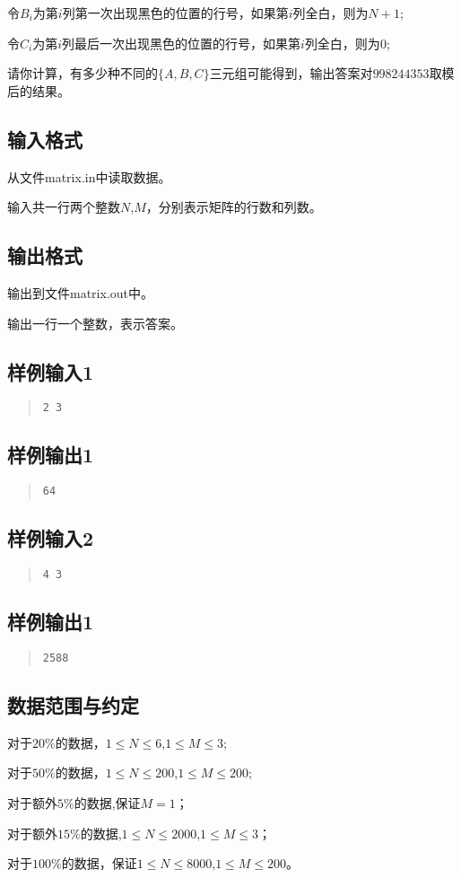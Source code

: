 ﻿\documentclass[12pt, a4paper]{article}
\begin{document}
令$B_i$为第$i$列第一次出现黑色的位置的行号，如果第$i$列全白，则为$N+1$;

令$C_i$为第$i$列最后一次出现黑色的位置的行号，如果第$i$列全白，则为$0$;

请你计算，有多少种不同的$\{A,B,C\}$三元组可能得到，输出答案对$998244353$取模后的结果。

\subsection{输入格式}

从文件matrix.in中读取数据。

输入共一行两个整数$N$,$M$，分别表示矩阵的行数和列数。

\subsection{输出格式}

输出到文件matrix.out中。

输出一行一个整数，表示答案。

\subsection{样例输入1}
\begin{quote}
\begin{verbatim}
2 3
\end{verbatim}
\end{quote}
\subsection{样例输出1}
\begin{quote}
\begin{verbatim}
64
\end{verbatim}
\end{quote}
\subsection{样例输入2}
\begin{quote}
\begin{verbatim}
4 3
\end{verbatim}
\end{quote}
\subsection{样例输出1}
\begin{quote}
\begin{verbatim}
2588
\end{verbatim}
\end{quote}
\subsection{数据范围与约定}

对于$20\%$的数据，$1 \leq N \leq 6$,$1 \leq M \leq 3$;

对于$50\%$的数据，$1 \leq N \leq 200$,$1 \leq M \leq 200$;

对于额外$5\%$的数据,保证$M=1$；

对于额外$15\%$的数据,$1 \leq N \leq 2000$,$1 \leq M \leq 3$；

对于$100\%$的数据，保证$1 \leq N \leq 8000$,$1 \leq M \leq 200$。
\end{document}

